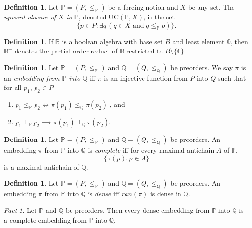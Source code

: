 \documentclass[12pt, twoside]{memoir}
\numberwithin{equation}{section}
\theoremstyle{definition}
\newtheorem{defi}[thm]{Definition}
\theoremstyle{remark}
\newtheorem{fact}[thm]{Fact}
\theoremstyle{definition}
\theoremstyle{definition}
\theoremstyle{definition}
\theoremstyle{remark}
\begin{document}
\begin{defi}
Let $\mathbb{P} = (P, \leq_{\mathbb{P}})$ be a forcing notion and $X$ be any set. The \emph{upward closure of} $X$ \emph{in} $\mathbb{P}$, denoted $\mathrm{UC}(\mathbb{P}, X)$, is the set $$\{p \in P : \exists q \ (q \in X \text{ and } q \leq_{\mathbb{P}} p)\}.$$
\end{defi}

\begin{defi}
If $\mathbb{B}$ is a boolean algebra with base set $B$ and least element $\mathbb{0}$, then $\mathbb{B}^+$ denotes the partial order reduct of $\mathbb{B}$ restricted to $B \setminus \{\mathbb{0}\}$.
\end{defi}

\begin{defi}
Let $\mathbb{P} = (P, \leq_{\mathbb{P}})$ and $\mathbb{Q} = (Q, \leq_{\mathbb{Q}})$ be preorders. We say $\pi$ is an \emph{embedding from} $\mathbb{P}$ \emph{into} $\mathbb{Q}$ iff $\pi$ is an injective function from $P$ into $Q$ such that for all $p_1$, $p_2 \in P$,
\begin{enumerate}[label=(\alph*)]
    \item $p_1 \leq_{\mathbb{P}} p_2 \iff \pi(p_1) \leq_{\mathbb{Q}} \pi(p_2)$ , and
    \item $p_1 \ \bot_{\mathbb{P}} \ p_2 \implies \pi(p_1) \ \bot_{\mathbb{Q}} \ \pi(p_2)$.
\end{enumerate}
\end{defi}

\begin{defi}
Let $\mathbb{P} = (P, \leq_{\mathbb{P}})$ and $\mathbb{Q} = (Q, \leq_{\mathbb{Q}})$ be preorders. An embedding $\pi$ from $\mathbb{P}$ into $\mathbb{Q}$ is \emph{complete} iff for every maximal antichain $A$ of $\mathbb{P}$, $$\{\pi(p) : p \in A\}$$ is a maximal antichain of $\mathbb{Q}$.
\end{defi}

\begin{defi}
Let $\mathbb{P} = (P, \leq_{\mathbb{P}})$ and $\mathbb{Q} = (Q, \leq_{\mathbb{Q}})$ be preorders. An embedding $\pi$ from $\mathbb{P}$ into $\mathbb{Q}$ is \emph{dense} iff $ran(\pi)$ is dense in $\mathbb{Q}$.
\end{defi}

\begin{fact}\label{dic}
Let $\mathbb{P}$ and $\mathbb{Q}$ be preorders. Then every dense embedding from $\mathbb{P}$ into $\mathbb{Q}$ is a complete embedding from $\mathbb{P}$ into $\mathbb{Q}$.
\end{fact}
\end{document}

